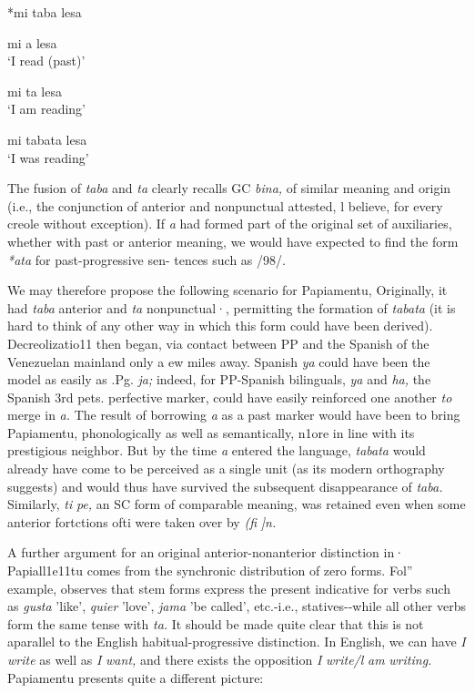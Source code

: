 \ea\label{ex:2:95}
 {*mi} {taba} {lesa} 
\z

\ea\label{ex:2:96}
mi a lesa\\
\glt `I read (past)'
\z



\ea\label{ex:2:97}
mi ta lesa\\
\glt `I am reading'
\z


\ea\label{ex:2:98}
mi tabata lesa\\
\glt `I was reading'
\z

The fusion of \textit{taba} and \textit{ta} clearly recalls GC \textit{bina,} of similar meaning and origin (i.e., the conjunction of anterior and nonpunctual attested, l believe, for every creole without exception). If \textit{a} had formed part of the original set of auxiliaries, whether with past or anterior meaning, we would have expected to find the form \textit{*ata} for past-progressive sen- tences such as /98/.

We may therefore propose the following scenario for Papia\-mentu, Originally, it had \textit{taba} anterior and \textit{ta} nonpunctual·, permitting the formation of \textit{tabata} (it is hard to think of any other way in which this form could have been derived). Decreolizatio11 then began, via contact between PP and the Spanish of the Venezuelan mainland only a ew miles away. Spanish \textit{ya }could have been the model as easily as .Pg. \textit{ja;} indeed, for PP-Spanish bilinguals, \textit{ya }and \textit{ha,} the Spanish 3rd pets. perfective marker, could have easily reinforced one another \textit{to} merge in \textit{a.} The result of borrowing \textit{a} as a past marker would have been to bring Papiamentu, phonologically as well as semantically, n1ore in line with its prestigious neighbor. But by the time \textit{a} entered the language, \textit{tabata} would already have come to be perceived as a single unit (as its modern orthography suggests) and would thus have survived the subsequent disappearance of \textit{taba. }Similarly, \textit{ti} \textit{pe, }an SC form of comparable meaning, was retained even when some anterior fortctions ofti were taken over by \textit{(}\textit{fi} \textit{]n.}

A further argument for an original anterior-nonanterior distinc\-tion in· Papiall1e11tu comes from the synchronic distribution of zero forms. Fol'' example, \citet[107]{Goilo1953} observes that stem forms express the present indicative for verbs such as \textit{gusta} 'like', \textit{quier} 'love', \textit{jama} 'be called', etc.-i.e., statives-{}-while all other verbs form the same tense with \textit{ta.} It should be made quite clear that this is not aparallel to the English habitual-progressive distinction. In English,
we can have \textit{I} \textit{write} as well as \textit{I} \textit{want,} and there exists the opposition
\textit{I} \textit{write/l} \textit{am} \textit{writing.} Papiamentu presents quite a different picture:

